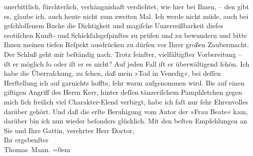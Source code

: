 \begin{ledgroupsized}[t]{13cm}
               unerbittlich, fürchterlich, verhängnishaft verdichtet, wie hier bei Ihnen, – den gibt
               es, glaube ich, auch heute {\pb}nicht zum
               zweiten Mal. Ich werde nicht müde, auch bei geſchloſſenem Buche die Dichtigkeit und
               magiſche Unzerreißbarkeit dieſes erotiſchen Kunſt- und Schickſalsgeſpinſtes zu prüfen
               und zu bewundern und bitte Ihnen meinen tiefen Reſpekt ausdrücken zu dürfen vor Ihrer
               großen Zaubermacht. Der Schluß geht mir beſtändig nach. Trotz feinſter,
               vielfältigſter Vorbereitung – iſt er möglich ſo oder iſt er es nicht? Auf jeden Fall
               iſt er überwältigend ſchön.\pend
           \pstart
           Ich habe die Überraſchung, zu ſehen, daß mein »Tod in
                  Venedig«, bei deſſen Herſtellung ich {\pb}auf garnichts hoffte, ſehr warm
               aufgenommen wird. Bis auf einen giftigen Angriff des Herrn Kerr, hinter deſſen tänzeriſchem Pamphletchen gegen mich ſich freilich viel Charakter-Elend
               verbirgt, habe ich faſt nur ſehr Ehrenvolles darüber gehört. Und daß die erſte
               Beruhigung vom Autor der »Frau Beate« kam,
               darüber bin ich nun wieder beſonders glücklich.\pend
           \pstart
           Mit den beſten Empfehlungen an Sie und Ihre Gattin, verehrter Herr Doctor,{\\[\baselineskip]}Ihr ergebenſter{\\[\baselineskip]}\spacefill\mbox{Thomas Mann.}\pend
           \leftskip=0em{}
         
         \endnumbering{}\end{ledgroupsized}  \newcommand{\dateiname}{L02139}\newcommand{\titel}{Thomas Mann an Arthur Schnitzler, 22. 5. 1913}\newcommand{\editorInnen}{Martin Anton Müller und Gerd-Hermann Susen}
      